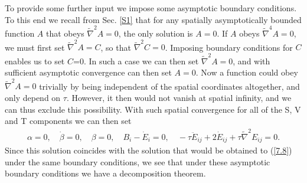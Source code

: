 \documentclass[aps,onecolumn,10pt]{revtex4}
\numberwithin{equation}{section}
\numberwithin{equation}{section}
\begin{document}
To provide some further input we impose some asymptotic boundary conditions. To this end  we recall from Sec. \ref{S1} that for any spatially asymptotically bounded function $A$ that obeys $\tilde{\nabla}^2A=0$, the only solution is $A=0$. If $A$ obeys $\tilde{\nabla}^4A=0$, we must first set $\tilde{\nabla}^2A=C$, so that $\tilde{\nabla}^2C=0$. Imposing boundary conditions for $C$ enables us to set $C$=0. In such a case we can then set $\tilde{\nabla}^2A=0$, and with sufficient asymptotic convergence can then set $A=0$. Now a function could obey $\tilde{\nabla}^2A=0$ trivially by being independent of the spatial coordinates altogether, and only depend on $\tau$. However, it then would not vanish at spatial infinity, and we can thus exclude this possibility. With such spatial convergence for all of the S, V and T components we can then set 
%
\begin{eqnarray}
\alpha=0,\quad \dot{\beta}=0,\quad \beta =0,\quad B_i-\dot{E}_i=0,\quad -\tau\ddot{E}_{ij}+2\dot{E}_{ij}+\tau\tilde{\nabla}^2E_{ij}=0.
\label{7.17}
\end{eqnarray}
%
Since this solution coincides with the solution that would be obtained to (\ref{7.8}) under the same boundary conditions, we see that under these asymptotic boundary conditions we have a decomposition theorem.
\end{document}
